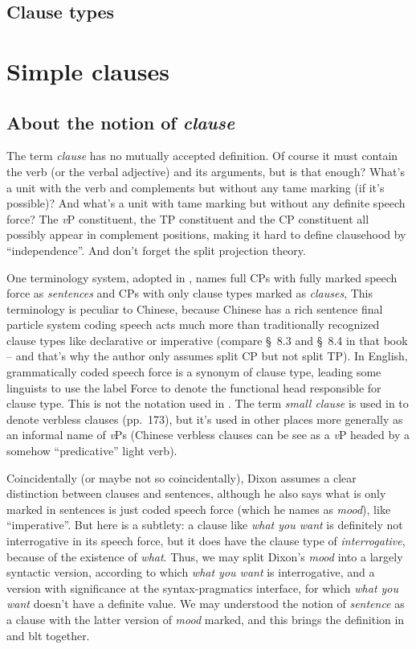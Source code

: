 \documentclass[UTF8, a4paper, oneside, scheme=plain]{ctexart}
\newcommand*{\citesec}[1]{\S~{#1}}
\newcommand*{\citepage}[1]{pp.~{#1}}
\newcommand*{\term}[1]{\emph{#1}}
\newcommand*{\corpus}[1]{\emph{#1}}
\newcommand*{\vP}{\textit{v}P}
\begin{document}
\subsection{Clause types}

\section{Simple clauses}

\subsection{About the notion of \term{clause}}

The term \term{clause} has no mutually accepted definition.
Of course it must contain the verb (or the verbal adjective)
and its arguments,
but is that enough?
What's a unit with the verb and complements but without any \ac{tame} marking
(if it's possible)?
And what's a unit with \ac{tame} marking but without any definite speech force? %
The \vP{} constituent, the TP constituent and the CP constituent 
all possibly appear in complement positions,
making it hard to define clausehood by ``independence''.
And don't forget the split projection theory.

One terminology system, 
adopted in \citep[\citepage{140}]{deng2010formal},
names full CPs with fully marked speech force as \term{sentences} 
and CPs with only clause types marked as \term{clauses},
This terminology is peculiar to Chinese,
because Chinese has a rich sentence final particle system 
coding speech acts much more than traditionally recognized clause types like declarative or imperative
(compare \citesec{8.3} and \citesec{8.4} in that book 
-- and that's why the author only assumes split CP but not split TP).
In English, grammatically coded speech force is a synonym of clause type,
leading some linguists to use the label Force to denote the functional head responsible for clause type.
This is not the notation used in \citet[\citepage{142}]{deng2010formal}.
The term \term{small clause} is used in \citet{deng2010formal} 
to denote verbless clauses (\citepage{173}),
but it's used in other places more generally as an informal name of \vP s
(Chinese verbless clauses can be see as a \vP{} headed by a somehow ``predicative'' light verb).

Coincidentally (or maybe not so coincidentally),
Dixon assumes a clear distinction between clauses and sentences,
although he also says what is only marked in sentences 
is just coded speech force (which he names as \term{mood}),
like ``imperative''.
But here is a subtlety:
a clause like \corpus{what you want} is definitely not interrogative in its speech force,
but it does have the clause type of \term{interrogative},
because of the existence of \corpus{what}.
Thus, we may split Dixon's \term{mood} into a largely syntactic version,
according to which \corpus{what you want} is interrogative,
and a version with significance at the syntax-pragmatics interface,
for which \corpus{what you want} doesn't have a definite value.
We may understood the notion of \term{sentence} as a clause 
with the latter version of \term{mood} marked,
and this brings the definition in \citet{deng2010formal} and \ac{blt} together.
\end{document}
